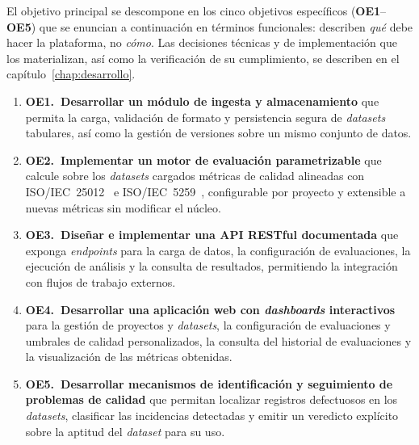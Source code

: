 El objetivo principal se descompone en los cinco objetivos específicos
(\textbf{OE1}--\textbf{OE5}) que se enuncian a continuación en términos
funcionales: describen \emph{qué} debe hacer la plataforma, no \emph{cómo}.
Las decisiones técnicas y de implementación que los materializan, así
como la verificación de su cumplimiento, se describen en el
capítulo~\ref{chap:desarrollo}.

\begin{enumerate}
  \item \textbf{OE1.\ Desarrollar un módulo de ingesta y almacenamiento}
    \label{sec:oe1}
    que permita la carga, validación de formato y persistencia segura de
    \emph{datasets} tabulares, así como la gestión de versiones sobre un
    mismo conjunto de datos.

  \item \textbf{OE2.\ Implementar un motor de evaluación parametrizable}
    \label{sec:oe2}
    que calcule sobre los \emph{datasets} cargados métricas de calidad
    alineadas con \ac{ISO}/\ac{IEC}~25012~\citep{iso25012} e
    \ac{ISO}/\ac{IEC}~5259~\citep{iso5259}, configurable por proyecto y
    extensible a nuevas métricas sin modificar el núcleo.

  \item \textbf{OE3.\ Diseñar e implementar una \ac{API} \ac{REST}ful
    documentada} \label{sec:oe3}
    que exponga \emph{endpoints} para la carga de datos, la
    configuración de evaluaciones, la ejecución de análisis y la consulta
    de resultados, permitiendo la integración con flujos de trabajo
    externos.

  \item \textbf{OE4.\ Desarrollar una aplicación web con \emph{dashboards}
    interactivos} \label{sec:oe4}
    para la gestión de proyectos y \emph{datasets}, la configuración de
    evaluaciones y umbrales de calidad personalizados, la consulta del
    historial de evaluaciones y la visualización de las métricas
    obtenidas.

  \item \textbf{OE5.\ Desarrollar mecanismos de identificación y
    seguimiento de problemas de calidad} \label{sec:oe5}
    que permitan localizar registros defectuosos en los
    \emph{datasets}, clasificar las incidencias detectadas y emitir un
    veredicto explícito sobre la aptitud del \emph{dataset} para su
    uso.
\end{enumerate}



